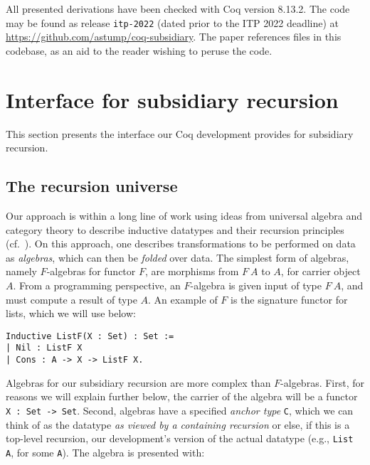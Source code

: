 \documentclass[a4paper,USenglish]{lipics-v2021}
\begin{document}
All presented derivations have been checked with Coq version 8.13.2.  The code may be
found as release \verb|itp-2022| (dated prior to the ITP 2022
deadline) at \url{https://github.com/astump/coq-subsidiary}.  The
paper references files in this codebase, as an aid to the reader
wishing to peruse the code.

\section{Interface for subsidiary recursion}
\label{sec:interface}

This section presents the interface our Coq development provides
for subsidiary recursion.

\subsection{The recursion universe}
\label{sec:recu}

Our approach is within a long line of work using ideas from universal
algebra and category theory to describe inductive datatypes and their
recursion principles (cf.~\cite{traytel12,cockett92,hagino87}).  On this approach, one describes transformations
to be performed on data as \emph{algebras}, which can then be
\textit{folded} over data.  The simplest form of algebras, namely
$F$-algebras for functor $F$, are morphisms from $F\ A$ to $A$, for carrier object
$A$.  From a programming perspective, an $F$-algebra is given input of
type $F\ A$, and must compute a result of type $A$.  An example of $F$
is the signature functor for lists, which we will use below:

\begin{verbatim}
Inductive ListF(X : Set) : Set :=
| Nil : ListF X
| Cons : A -> X -> ListF X.
\end{verbatim}

Algebras for our subsidiary recursion are more complex than $F$-algebras.  First, for
reasons we will explain further below, the carrier of the algebra will
be a functor \verb|X : Set -> Set|.  Second, algebras have a specified
\emph{anchor type} \verb|C|, which we can think of as the datatype
\emph{as viewed by a containing recursion} or else, if this is a
top-level recursion, our development's version of the actual datatype
(e.g., \verb|List A|, for some \verb|A|).  The algebra is presented with:
\end{document}

